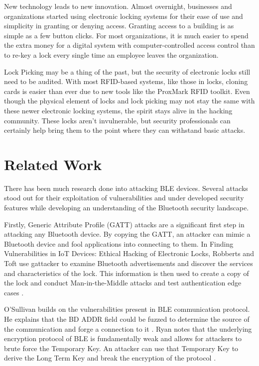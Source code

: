 \documentclass[10pt,twocolumn,letterpaper]{article}
\begin{document}
New technology leads to new innovation.  Almost overnight, businesses and organizations started using electronic locking systems for their ease of use and simplicity in granting or denying access.  Granting access to a building is as simple as a few button clicks.  For most organizations, it is much easier to spend the extra money for a digital system with computer-controlled access control than to re-key a lock every single time an employee leaves the organization.

Lock Picking may be a thing of the past, but the security of electronic locks still need to be audited.  With most RFID-based systems, like those in locks, cloning cards is easier than ever due to new tools like the ProxMark RFID toolkit.\cite{7945583}  Even though the physical element of locks and lock picking may not stay the same with these newer electronic locking systems, the spirit stays alive in the hacking community.  These locks aren't invulnerable, but security professionals can certainly help bring them to the point where they can withstand basic attacks.


\section{Related Work}
There has been much research done into attacking BLE devices. Several attacks stood out for their exploitation of vulnerabilities and under developed security features while developing an understanding of the Bluetooth security landscape.

Firstly, Generic Attribute Profile (GATT) attacks are a significant first step in attacking any Bluetooth device. By copying the GATT, an attacker can mimic a Bluetooth device and fool applications into connecting to them. In Finding Vulnerabilities in IoT Devices: Ethical Hacking of Electronic Locks, Robberts and Toft use gattacker to examine Bluetooth advertisements and discover the services and characteristics of the lock. This information is then used to create a copy of the lock and conduct Man-in-the-Middle attacks and test authentication edge cases \cite{KTH}.

O'Sullivan builds on the vulnerabilities present in BLE communication protocol. He explains that the BD ADDR field could be fuzzed to determine the source of the communication and forge a connection to it \cite{osullivan}. Ryan notes that the underlying encryption protocol of BLE is fundamentally weak and allows for attackers to brute force the Temporary Key. An attacker can use that Temporary Key to derive the Long Term Key and break the encryption of the protocol \cite{mryan13}.
\end{document}
